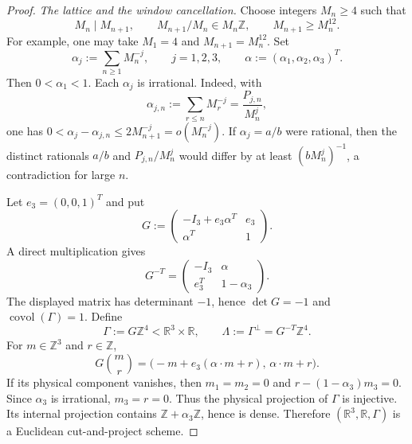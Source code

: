 \documentclass[11pt,reqno,a4paper]{amsart}
\numberwithin{equation}{section}
\theoremstyle{compact}
\theoremstyle{definition}
\theoremstyle{definition}
\begin{document}
\begin{proof}
\smallskip\noindent\emph{The lattice and the window cancellation.}
Choose integers $M_n\geq4$ such that
\begin{equation}\label{eq:cap-codim-one-growth}
  M_n\mid M_{n+1},
  \qquad
  M_{n+1}/M_n\in M_n\mathbb Z,
  \qquad
  M_{n+1}\geq M_n^{12}.
\end{equation}
For example, one may take $M_1=4$ and $M_{n+1}=M_n^{12}$.  Set
\begin{equation}\label{eq:cap-codim-one-alpha}
  \alpha_j:=\sum_{n\geq1}M_n^{-j},
  \qquad j=1,2,3,
  \qquad
  \alpha:=(\alpha_1,\alpha_2,\alpha_3)^T.
\end{equation}
Then $0<\alpha_1<1$.  Each $\alpha_j$ is irrational.  Indeed, with
\begin{equation}\label{eq:cap-codim-one-prefixes-intro}
  \alpha_{j,n}:=\sum_{r\leq n}M_r^{-j}
  =\frac{P_{j,n}}{M_n^j},
\end{equation}
one has
\(
  0<\alpha_j-\alpha_{j,n}\leq2M_{n+1}^{-j}=o(M_n^{-j}).
\)
If $\alpha_j=a/b$ were rational, then the distinct rationals $a/b$ and
$P_{j,n}/M_n^j$ would differ by at least $(bM_n^j)^{-1}$, a contradiction for
large $n$.

Let $e_3=(0,0,1)^T$ and put
\begin{equation}\label{eq:cap-codim-one-G}
  G:=
  \begin{pmatrix}
    -I_3+e_3\alpha^T & e_3\\
    \alpha^T & 1
  \end{pmatrix}.
\end{equation}
A direct multiplication gives
\begin{equation}\label{eq:cap-codim-one-Gdual}
  G^{-T}
  =
  \begin{pmatrix}
    -I_3 & \alpha\\
    e_3^T & 1-\alpha_3
  \end{pmatrix}.
\end{equation}
The displayed matrix has determinant $-1$, hence $\det G=-1$ and
$\operatorname{covol}(\Gamma)=1$.  Define
\[
  \Gamma:=G\mathbb Z^4<\mathbb R^3\times\mathbb R,
  \qquad
  \Lambda:=\Gamma^\perp=G^{-T}\mathbb Z^4.
\]
For $m\in\mathbb Z^3$ and $r\in\mathbb Z$,
\[
  G\binom mr
  =\bigl(-m+e_3(\alpha\cdot m+r),\,\alpha\cdot m+r\bigr).
\]
If its physical component vanishes, then $m_1=m_2=0$ and
$r-(1-\alpha_3)m_3=0$.  Since $\alpha_3$ is irrational, $m_3=r=0$.
Thus the physical projection of $\Gamma$ is injective.  Its internal
projection contains $\mathbb Z+\alpha_3\mathbb Z$, hence is dense.  Therefore
$(\mathbb R^3,\mathbb R,\Gamma)$ is a Euclidean cut-and-project scheme.


\end{proof}
\end{document}

